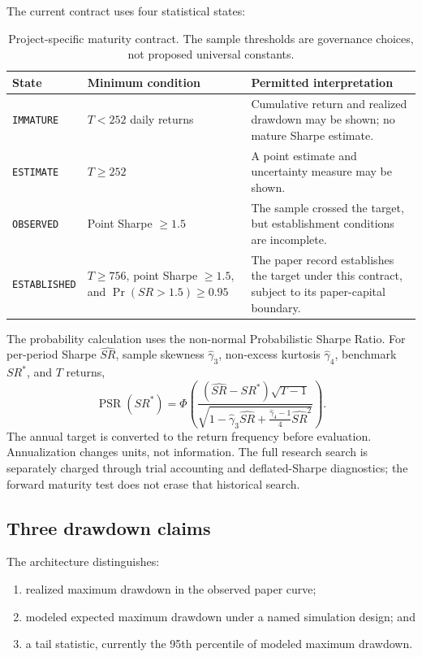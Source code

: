 \documentclass[11pt]{article}
\newcommand{\status}[1]{\texttt{#1}}
\begin{document}
The current contract uses four statistical states:

\begin{table}[H]
\centering
\small
\begin{tabularx}{\linewidth}{>{\raggedright\arraybackslash}p{35mm}>{\raggedright\arraybackslash}p{36mm}X}
\toprule
State & Minimum condition & Permitted interpretation \\
\midrule
\status{IMMATURE} & $T<252$ daily returns & Cumulative return and realized drawdown may be shown; no mature Sharpe estimate. \\
\status{ESTIMATE} & $T\geq252$ & A point estimate and uncertainty measure may be shown. \\
\status{OBSERVED} & Point Sharpe $\geq1.5$ & The sample crossed the target, but establishment conditions are incomplete. \\
\status{ESTABLISHED} & $T\geq756$, point Sharpe $\geq1.5$, and $\Pr(SR>1.5)\geq0.95$ & The paper record establishes the target under this contract, subject to its paper-capital boundary. \\
\bottomrule
\end{tabularx}
\caption{Project-specific maturity contract. The sample thresholds are governance choices, not proposed universal constants.}
\label{tab:maturity}
\end{table}

The probability calculation uses the non-normal Probabilistic Sharpe Ratio. For per-period Sharpe $\widehat{SR}$, sample skewness $\widehat{\gamma}_3$, non-excess kurtosis $\widehat{\gamma}_4$, benchmark $SR^*$, and $T$ returns,
\begin{equation}
 \operatorname{PSR}(SR^*) = \Phi\!\left(
 \frac{(\widehat{SR}-SR^*)\sqrt{T-1}}
 {\sqrt{1-\widehat{\gamma}_3\widehat{SR}+\frac{\widehat{\gamma}_4-1}{4}\widehat{SR}^{2}}}
 \right).
\end{equation}
The annual target is converted to the return frequency before evaluation. Annualization changes units, not information. The full research search is separately charged through trial accounting and deflated-Sharpe diagnostics; the forward maturity test does not erase that historical search.

\subsection{Three drawdown claims}

The architecture distinguishes:

\begin{enumerate}
  \item realized maximum drawdown in the observed paper curve;
  \item modeled expected maximum drawdown under a named simulation design; and
  \item a tail statistic, currently the 95th percentile of modeled maximum drawdown.
\end{enumerate}
\end{document}
